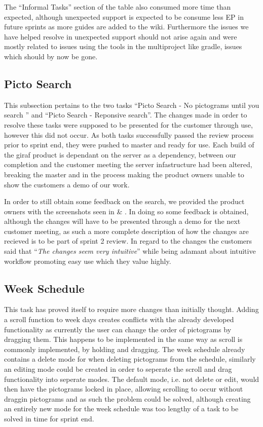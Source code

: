 The ``Informal Tasks'' section of the table also consumed more time than expected, although unexpected support is expected to be consume less EP in future sprints as more guides are added to the wiki.
Furthermore the issues we have helped resolve in unexpected support should not arise again and were mostly related to issues using the tools in the multiproject like gradle, issues which should by now be gone.

\subsection{Picto Search}
This subsection pertains to the two tasks ``Picto Search - No pictograms until you search '' and ``Picto Search - Reponsive search''.
The changes made in order to resolve these tasks were supposed to be presented for the customer through use, however this did not occur.
As both tasks successfully passed the review process prior to sprint end, they were pushed to master and ready for use.
Each build of the giraf product is dependant on the server as a dependency, between our completion and the customer meeting the server infastructure had been altered, breaking the master and in the process making the product owners unable to show the customers a demo of our work.

In order to still obtain some feedback on the search, we provided the product owners with the screenshots seen in  \& .
In doing so some feedback is obtained, although the changes will have to be presented through a demo for the next customer meeting, as such a more complete description of how the changes are recieved is to be part of sprint 2 review.
In regard to the changes the customers said that ``\textit{The changes seem very intuitive}'' while being adamant about intuitive workflow promoting easy use which they value highly.

\subsection{Week Schedule}
This task has proved itself to require more changes than initially thought.
Adding a scroll function to week days creates conflicts with the already developed functionality as currently the user can change the order of pictograms by dragging them.
This happens to be implemented in the same way as scroll is commonly implemented, by holding and dragging.
The week schedule already contains a delete mode for when deleting pictograms from the schedule, similarly an editing mode could be created in order to seperate the scroll and drag functionality into seperate modes.
The default mode, i.e. not delete or edit, would then have the pictograms locked in place, allowing scrolling to occur without draggin pictograms and as such the problem could be solved, although creating an entirely new mode for the week schedule was too lengthy of a task to be solved in time for sprint end.